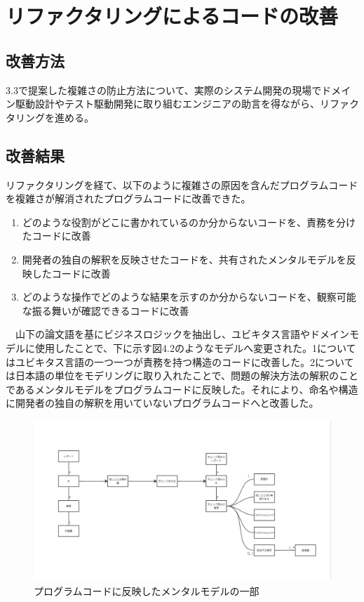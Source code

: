 \documentclass[12pt, a4paper]{jreport}
\begin{document}
\chapter{リファクタリングによるコードの改善}
\section{改善方法}
3.3で提案した複雑さの防止方法について、実際のシステム開発の現場でドメイン駆動設計やテスト駆動開発に取り組むエンジニアの助言を得ながら、リファクタリングを進める。
\section{改善結果}
リファクタリングを経て、以下のように複雑さの原因を含んだプログラムコードを複雑さが解消されたプログラムコードに改善できた。
\begin{enumerate}
\item どのような役割がどこに書かれているのか分からないコードを、責務を分けたコードに改善
\item 開発者の独自の解釈を反映させたコードを、共有されたメンタルモデルを反映したコードに改善
\item どのような操作でどのような結果を示すのか分からないコードを、観察可能な振る舞いが確認できるコードに改善
\end{enumerate}
　山下の論文語を基にビジネスロジックを抽出し、ユビキタス言語やドメインモデルに使用したことで、下に示す図4.2のようなモデルへ変更された。1についてはユビキタス言語の一つ一つが責務を持つ構造のコードに改善した。2については日本語の単位をモデリングに取り入れたことで、問題の解決方法の解釈のことであるメンタルモデルをプログラムコードに反映した。それにより、命名や構造に開発者の独自の解釈を用いていないプログラムコードへと改善した。
\begin{figure}[H]
\centering
\includegraphics[width=1\linewidth]{image/kaizen2.png}
\caption{プログラムコードに反映したメンタルモデルの一部}
\label{fig:enter-label}
\end{figure}
\end{document}
